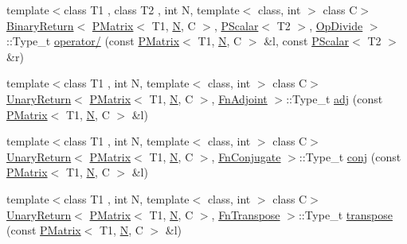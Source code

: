 \begin{DoxyCompactItemize}
\item 
{\footnotesize template$<$class T1 , class T2 , int N, template$<$ class, int $>$ class C$>$ }\\\mbox{\hyperlink{structENSEM_1_1BinaryReturn}{Binary\+Return}}$<$ \mbox{\hyperlink{classENSEM_1_1PMatrix}{P\+Matrix}}$<$ T1, \mbox{\hyperlink{operator__name__util_8cc_a7722c8ecbb62d99aee7ce68b1752f337}{N}}, C $>$, \mbox{\hyperlink{classENSEM_1_1PScalar}{P\+Scalar}}$<$ T2 $>$, \mbox{\hyperlink{structENSEM_1_1OpDivide}{Op\+Divide}} $>$\+::Type\+\_\+t \mbox{\hyperlink{group__primmatrix_ga1b00e76a765453dfbb33f0630bd863c3}{operator/}} (const \mbox{\hyperlink{classENSEM_1_1PMatrix}{P\+Matrix}}$<$ T1, \mbox{\hyperlink{operator__name__util_8cc_a7722c8ecbb62d99aee7ce68b1752f337}{N}}, C $>$ \&l, const \mbox{\hyperlink{classENSEM_1_1PScalar}{P\+Scalar}}$<$ T2 $>$ \&r)
\item 
{\footnotesize template$<$class T1 , int N, template$<$ class, int $>$ class C$>$ }\\\mbox{\hyperlink{structENSEM_1_1UnaryReturn}{Unary\+Return}}$<$ \mbox{\hyperlink{classENSEM_1_1PMatrix}{P\+Matrix}}$<$ T1, \mbox{\hyperlink{operator__name__util_8cc_a7722c8ecbb62d99aee7ce68b1752f337}{N}}, C $>$, \mbox{\hyperlink{structENSEM_1_1FnAdjoint}{Fn\+Adjoint}} $>$\+::Type\+\_\+t \mbox{\hyperlink{group__primmatrix_ga443bf356f8bca93ff78f16db721417b9}{adj}} (const \mbox{\hyperlink{classENSEM_1_1PMatrix}{P\+Matrix}}$<$ T1, \mbox{\hyperlink{operator__name__util_8cc_a7722c8ecbb62d99aee7ce68b1752f337}{N}}, C $>$ \&l)
\item 
{\footnotesize template$<$class T1 , int N, template$<$ class, int $>$ class C$>$ }\\\mbox{\hyperlink{structENSEM_1_1UnaryReturn}{Unary\+Return}}$<$ \mbox{\hyperlink{classENSEM_1_1PMatrix}{P\+Matrix}}$<$ T1, \mbox{\hyperlink{operator__name__util_8cc_a7722c8ecbb62d99aee7ce68b1752f337}{N}}, C $>$, \mbox{\hyperlink{structENSEM_1_1FnConjugate}{Fn\+Conjugate}} $>$\+::Type\+\_\+t \mbox{\hyperlink{group__primmatrix_gabbacb7d7e40fcf5d0bcd18aa907d33ea}{conj}} (const \mbox{\hyperlink{classENSEM_1_1PMatrix}{P\+Matrix}}$<$ T1, \mbox{\hyperlink{operator__name__util_8cc_a7722c8ecbb62d99aee7ce68b1752f337}{N}}, C $>$ \&l)
\item 
{\footnotesize template$<$class T1 , int N, template$<$ class, int $>$ class C$>$ }\\\mbox{\hyperlink{structENSEM_1_1UnaryReturn}{Unary\+Return}}$<$ \mbox{\hyperlink{classENSEM_1_1PMatrix}{P\+Matrix}}$<$ T1, \mbox{\hyperlink{operator__name__util_8cc_a7722c8ecbb62d99aee7ce68b1752f337}{N}}, C $>$, \mbox{\hyperlink{structENSEM_1_1FnTranspose}{Fn\+Transpose}} $>$\+::Type\+\_\+t \mbox{\hyperlink{group__primmatrix_gaffe281aeb23abb6d655321654f855e26}{transpose}} (const \mbox{\hyperlink{classENSEM_1_1PMatrix}{P\+Matrix}}$<$ T1, \mbox{\hyperlink{operator__name__util_8cc_a7722c8ecbb62d99aee7ce68b1752f337}{N}}, C $>$ \&l)

\end{DoxyCompactItemize}
